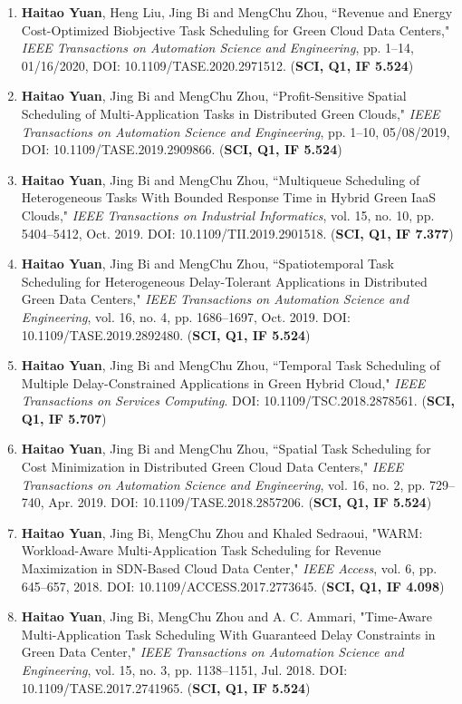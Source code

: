 \documentclass[margin,line]{res}
\begin{document}
\begin{resume}
\begin{enumerate}
\item \textbf{Haitao Yuan}, Heng Liu, Jing Bi and MengChu Zhou, ``Revenue and Energy Cost-Optimized Biobjective Task Scheduling for Green Cloud Data Centers," \emph{IEEE Transactions on Automation Science and Engineering}, pp. 1--14, 01/16/2020, DOI: 10.1109/TASE.2020.2971512. (\textbf{SCI, Q1, IF 5.524})
\item \textbf{Haitao Yuan}, Jing Bi and MengChu Zhou, ``Profit-Sensitive Spatial Scheduling of Multi-Application Tasks in Distributed Green Clouds," \emph{IEEE Transactions on Automation Science and Engineering}, pp. 1--10, 05/08/2019, DOI: 10.1109/TASE.2019.2909866. (\textbf{SCI, Q1, IF 5.524})
\item \textbf{Haitao Yuan}, Jing Bi and MengChu Zhou, ``Multiqueue Scheduling of Heterogeneous Tasks With Bounded Response Time in Hybrid Green IaaS Clouds," \emph{IEEE Transactions on Industrial Informatics}, vol. 15, no. 10, pp. 5404--5412, Oct. 2019. DOI: 10.1109/TII.2019.2901518. (\textbf{SCI, Q1, IF 7.377})
\item \textbf{Haitao Yuan}, Jing Bi and MengChu Zhou, ``Spatiotemporal Task Scheduling for Heterogeneous Delay-Tolerant Applications in Distributed Green Data Centers," \emph{IEEE Transactions on Automation Science and Engineering}, vol. 16, no. 4, pp. 1686--1697, Oct. 2019. DOI: 10.1109/TASE.2019.2892480. (\textbf{SCI, Q1, IF 5.524})
\item \textbf{Haitao Yuan}, Jing Bi and MengChu Zhou, ``Temporal Task Scheduling of Multiple Delay-Constrained Applications in Green Hybrid Cloud," \emph{IEEE Transactions on Services Computing}. DOI: 10.1109/TSC.2018.2878561. (\textbf{SCI, Q1, IF 5.707})
\item \textbf{Haitao Yuan}, Jing Bi and MengChu Zhou, ``Spatial Task Scheduling for Cost Minimization in Distributed Green Cloud Data Centers," \emph{IEEE Transactions on Automation Science and Engineering}, vol. 16, no. 2, pp. 729--740, Apr. 2019. DOI: 10.1109/TASE.2018.2857206. (\textbf{SCI, Q1, IF 5.524})
\item \textbf{Haitao Yuan}, Jing Bi, MengChu Zhou and Khaled Sedraoui, "WARM: Workload-Aware Multi-Application Task Scheduling for Revenue Maximization in SDN-Based Cloud Data Center," \emph{IEEE Access}, vol. 6, pp. 645--657, 2018. DOI: 10.1109/ACCESS.2017.2773645. (\textbf{SCI, Q1, IF 4.098})
\item \textbf{Haitao Yuan}, Jing Bi, MengChu Zhou and A. C. Ammari, "Time-Aware Multi-Application Task Scheduling With Guaranteed Delay Constraints in Green Data Center," \emph{IEEE Transactions on Automation Science and Engineering}, vol. 15, no. 3, pp. 1138--1151, Jul. 2018. DOI: 10.1109/TASE.2017.2741965. (\textbf{SCI, Q1, IF 5.524})

\end{enumerate}
\end{resume}
\end{document}
